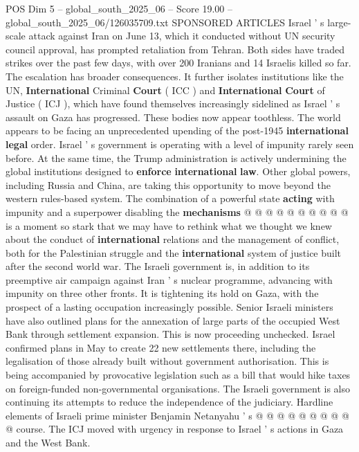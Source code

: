 \begin{textsample}{POS Dim 5 – global\_south\_2025\_06 – Score 19.00 – global\_south\_2025\_06/126035709.txt}  \label{ex:f5_pos_041}
SPONSORED ARTICLES Israel ' s large-scale attack against Iran on June 13, which it conducted without UN security council approval, has prompted retaliation from Tehran.
Both sides have traded strikes over the past few days, with over 200 Iranians and 14 Israelis killed so far.
The escalation has broader consequences.
It further isolates institutions like the UN, \textbf{International} Criminal \textbf{Court} ( ICC ) and \textbf{International} \textbf{Court} of Justice ( ICJ ), which have found themselves increasingly sidelined as Israel ' s assault on Gaza has progressed.
These bodies now appear toothless.
The world appears to be facing an unprecedented upending of the post-1945 \textbf{international} \textbf{legal} order.
Israel ' s government is operating with a level of impunity rarely seen before.
At the same time, the Trump administration is actively undermining the global institutions designed to \textbf{enforce} \textbf{international} \textbf{law}.
Other global powers, including Russia and China, are taking this opportunity to move beyond the western rules-based system.
The combination of a powerful state \textbf{acting} with impunity and a superpower disabling the \textbf{mechanisms} @ @ @ @ @ @ @ @ @ @ is a moment so stark that we may have to rethink what we thought we knew about the conduct of \textbf{international} relations and the management of conflict, both for the Palestinian struggle and the \textbf{international} system of justice built after the second world war.
The Israeli government is, in addition to its preemptive air campaign against Iran ' s nuclear programme, advancing with impunity on three other fronts.
It is tightening its hold on Gaza, with the prospect of a lasting occupation increasingly possible.
Senior Israeli ministers have also outlined plans for the annexation of large parts of the occupied West Bank through settlement expansion.
This is now proceeding unchecked.
Israel confirmed plans in May to create 22 new settlements there, including the legalisation of those already built without government authorisation.
This is being accompanied by provocative legislation such as a bill that would hike taxes on foreign-funded non-governmental organisations.
The Israeli government is also continuing its attempts to reduce the independence of the judiciary.
Hardline elements of Israeli prime minister Benjamin Netanyahu ' s @ @ @ @ @ @ @ @ @ @ course.
The ICJ moved with urgency in response to Israel ' s actions in Gaza and the West Bank.

\end{textsample}
